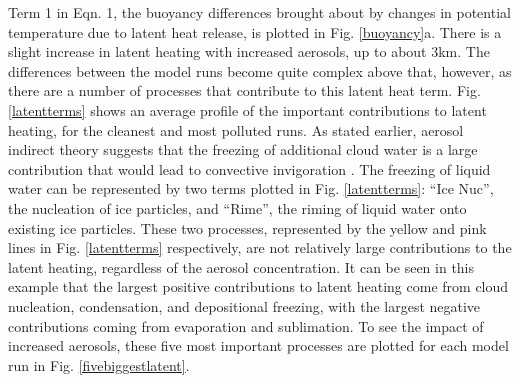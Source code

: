 Term 1 in Eqn. 1, the buoyancy differences brought about by changes in potential temperature due to latent heat release, is plotted in Fig. \ref{buoyancy}a.  There is a slight increase in latent heating with increased aerosols, up to about 3km.  The differences between the model runs become quite complex above that, however, as there are a number of processes that contribute to this latent heat term.  Fig. \ref{latentterms} shows an average profile of the important contributions to latent heating, for the cleanest and most polluted runs.  As stated earlier, aerosol indirect theory suggests that the freezing of additional cloud water is a large contribution that would lead to convective invigoration \citep{Andreae:2004p32,Khain:2005p71,vandenHeever:2006p1147,Rosenfeld:2008p24,taoreview}.  The freezing of liquid water can be represented by two terms plotted in Fig. \ref{latentterms}: ``Ice Nuc'', the nucleation of ice particles, and ``Rime'', the riming of liquid water onto existing ice particles.  These two processes, represented by the yellow and pink lines in Fig. \ref{latentterms} respectively, are not relatively large contributions to the latent heating, regardless of the aerosol concentration.  It can be seen in this example that the largest positive contributions to latent heating come from cloud nucleation, condensation, and depositional freezing, with the largest negative contributions coming from evaporation and sublimation.  To see the impact of increased aerosols, these five most important processes are plotted for each model run in Fig. \ref{fivebiggestlatent}.  

